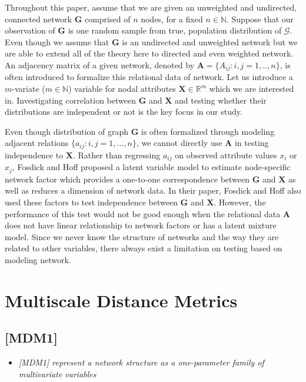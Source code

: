 \documentclass[12pt]{article}
\theoremstyle{definition}
\begin{document}
 
 Throughout this paper, assume that we are given an unweighted and undirected, connected network $\boldsymbol{G}$ comprised of $n$ nodes, for a fixed $n \in \mathbb{N}$. Suppose that our observation of $\boldsymbol{G}$ is one random sample from true, population distribution of $\mathcal{G}$. Even though we assume that $\boldsymbol{G}$ is an undirected and unweighted network but we are able to extend all of the theory here to directed and even weighted network. An adjacency matrix of a given network, denoted by $\boldsymbol{A} = \{A_{ij} : i,j= 1,..,n \}$, is often introduced to formalize this relational data of network. Let us introduce a $m$-variate ($m \in \mathbb{N}$) variable for nodal attributes $\boldsymbol{X}  \in \mathbb{R}^{m}$ which we are interested in. Investigating correlation between $\boldsymbol{G}$ and $\boldsymbol{X}$ and testing whether their distributions are independent or not is the key focus in our study. 
 
 Even though distribution of graph $\boldsymbol{G}$ is often formalized through modeling adjacent relations $\{a_{ij} : i,j = 1,... , n \}$, we cannot directly use $\mathbf{A}$ in testing independence to $\mathbf{X}$. Rather than regressing $a_{ij}$ on observed attribute values $x_{i}$ or $x_{j}$, Fosdick and Hoff proposed a latent variable model to estimate node-specific network factor which provides a one-to-one correspondence between $\boldsymbol{G}$ and $\boldsymbol{X}$ as well as reduces a dimension of network data. In their paper, Fosdick and Hoff also used these factors to test independence between $\boldsymbol{G}$ and $\boldsymbol{X}$. However, the performance of this test would not be good enough when the relational data $\boldsymbol{A}$ does not have linear relationship to network factors or has a latent mixture model. Since we never know the structure of networks and the way they are related to other variables, there always exist a limitation on testing based on modeling network.    

\newpage
\section{Multiscale Distance Metrics}

\subsection{[MDM1]}
\begin{itemize}
	\item {\it  [MDM1] represent a network structure as a one-parameter family of multivariate variables \/}
\end{itemize}
\end{document}
